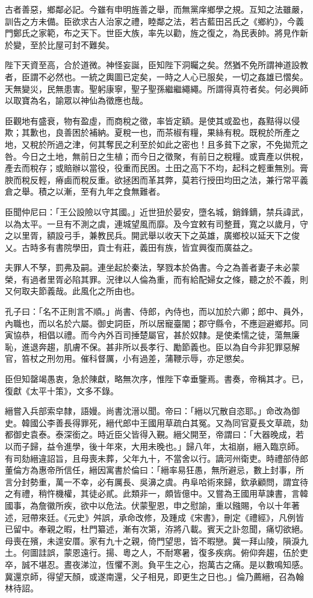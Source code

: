 \begin{pinyinscope}
古者善惡，鄉鄰必記。今雖有申明旌善之舉，而無黨庠鄉學之規。互知之法雖嚴，訓告之方未備。臣欲求古人治家之禮，睦鄰之法，若古藍田呂氏之《鄉約》，今義門鄭氏之家範，布之天下。世臣大族，率先以勸，旌之復之，為民表帥。將見作新於變，至於比屋可封不難矣。

陛下天資至高，合於道微。神怪妄誕，臣知陛下洞矚之矣。然猶不免所謂神道設教者，臣謂不必然也。一統之輿圖已定矣，一時之人心已服矣，一切之姦雄已慴矣。天無變災，民無患害。聖躬康寧，聖子聖孫繼繼繩繩。所謂得真符者矣。何必興師以取寶為名，諭眾以神仙為徵應也哉。

臣觀地有盛衰，物有盈虛，而商稅之徵，率皆定額。是使其或盈也，姦黠得以侵欺；其歉也，良善困於補納。夏稅一也，而茶椒有糧，果絲有稅。既稅於所產之地，又稅於所過之津，何其奪民之利至於如此之密也！且多貧下之家，不免拋荒之咎。今日之土地，無前日之生植；而今日之徵聚，有前日之稅糧。或賣產以供稅，產去而稅存；或賠辦以當役，役重而民困。土田之高下不均，起科之輕重無別。膏腴而稅反輕，瘠鹵而稅反重。欲拯困而革其弊，莫若行授田均田之法，兼行常平義倉之舉。積之以漸，至有九年之食無難者。

臣聞仲尼曰：「王公設險以守其國。」近世狃於晏安，墮名城，銷鋒鏑，禁兵諱武，以為太平。一旦有不測之虞，連城望風而靡。及今宜敕有司整葺，寬之以歲月，守之以里胥，額設弓手，兼教民兵。開武舉以收天下之英雄，廣鄉校以延天下之俊乂。古時多有書院學田，貢士有莊，義田有族，皆宜興復而廣益之。

夫罪人不孥，罰弗及嗣。連坐起於秦法，孥戮本於偽書。今之為善者妻子未必蒙榮，有過者里胥必陷其罪。況律以人倫為重，而有給配婦女之條，聽之於不義，則又何取夫節義哉。此風化之所由也。

孔子曰：「名不正則言不順。」尚書、侍郎，內侍也，而以加於六卿；郎中、員外，內職也，而以名於六屬。御史詞臣，所以居寵臺閣；郡守縣令，不應迴避鄉邦。同寅協恭，相倡以禮。而今內外百司捶楚屬官，甚於奴隸。是使柔懦之徒，蕩無廉恥，進退奔趨，肌膚不保。甚非所以長孝行、勵節義也。臣以為自今非犯罪惡解官，笞杖之刑勿用。催科督厲，小有過差，蒲鞭示辱，亦足懲矣。

臣但知罄竭愚衷，急於陳獻，略無次序，惟陛下幸垂鑒焉。書奏，帝稱其才。已，復獻《太平十策》，文多不錄。

縉嘗入兵部索皁隸，語嫚。尚書沈溍以聞。帝曰：「縉以冗散自恣耶。」命改為御史。韓國公李善長得罪死，縉代郎中王國用草疏白其冤。又為同官夏長文草疏，劾都御史袁泰。泰深銜之。時近臣父皆得入覲。縉父開至，帝謂曰：「大器晚成，若以而子歸，益令進學，後十年來，大用未晚也。」歸八年，太祖崩，縉入臨京師。有司劾縉違詔旨，且母喪未葬，父年九十，不當舍以行。謫河州衛吏。時禮部侍郎董倫方為惠帝所信任，縉因寓書於倫曰：「縉率易狂愚，無所避忌，數上封事，所言分封勢重，萬一不幸，必有厲長、吳濞之虞。冉阜哈術來歸，欽承顧問，謂宜待之有禮，稍忤機權，其徒必貳。此類非一，頗皆億中。又嘗為王國用草諫書，言韓國事，為詹徽所疾，欲中以危法。伏蒙聖恩，申之慰諭，重以鏹賜，令以十年著述，冠帶來廷。《元史》舛誤，承命改修，及踵成《宋書》，刪定《禮經》，凡例皆已留中。奉親之暇，杜門纂述，漸有次第，洊將八載。賓天之訃忽聞，痛切欲絕。母喪在殯，未遑安厝。家有九十之親，倚門望思，皆不暇戀。冀一拜山陵，隕淚九土。何圖詿誤，蒙恩遠行。揚、粵之人，不耐寒暑，復多疾病。俯仰奔趨，伍於吏卒，誠不堪忍。晝夜涕泣，恆懼不測。負平生之心，抱萬古之痛。是以數鳴知感。冀還京師，得望天顏，或遂南還，父子相見，即更生之日也。」倫乃薦縉，召為翰林待詔。


\end{pinyinscope}
